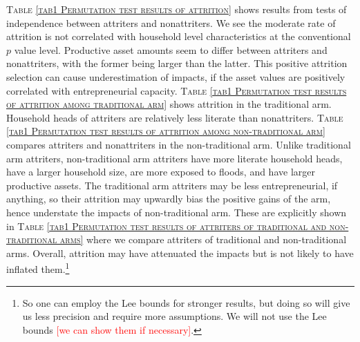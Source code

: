 	\textsc{\normalsize Table \ref{tab1 Permutation test results of attrition}} shows results from tests of independence between attriters and nonattriters. We see the moderate rate of attrition is not correlated with household level characteristics at the conventional $p$ value level. Productive asset amounts seem to differ between attriters and nonattriters, with the former being larger than the latter. This positive attrition selection can cause underestimation of impacts, if the asset values are positively correlated with entrepreneurial capacity. \textsc{\normalsize Table \ref{tab1 Permutation test results of attrition among traditional arm}} shows attrition in the \textsf{traditional} arm. Household heads of attriters are relatively less literate than nonattriters. \textsc{\normalsize Table \ref{tab1 Permutation test results of attrition among non-traditional arm}} compares attriters and nonattriters in the non-\textsf{traditional} arm. Unlike \textsf{traditional} arm attriters, non-\textsf{traditional} arm attriters have more literate household heads, have a larger household size, are more exposed to floods, and have larger productive assets. The \textsf{traditional} arm attriters may be less entrepreneurial, if anything, so their attrition may upwardly bias the positive gains of the arm, hence understate the impacts of non-\textsf{traditional} arm. These are explicitly shown in \textsc{\normalsize Table \ref{tab1 Permutation test results of attriters of traditional and non-traditional arms}} where we compare attriters of \textsf{traditional} and non-\textsf{traditional} arms. Overall, attrition may have attenuated the impacts but is not likely to have inflated them.\footnote{So one can employ the Lee bounds for stronger results, but doing so will give us less precision and require more assumptions. We will not use the Lee bounds \textcolor{red}{[we can show them if necessary]}. }

